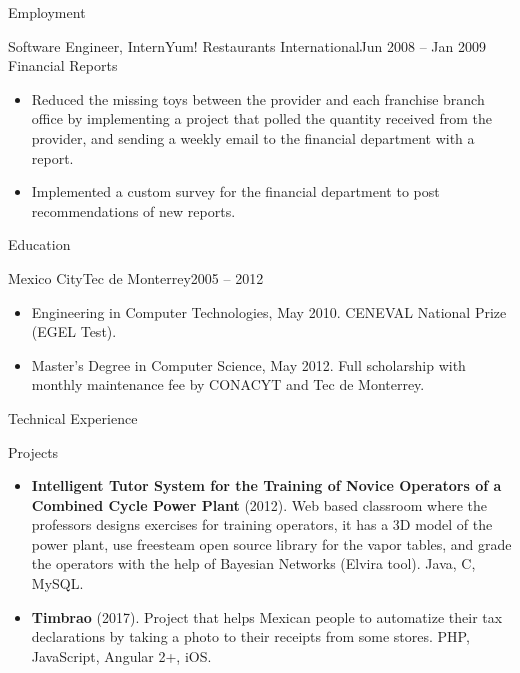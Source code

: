 \documentclass[calibri]{../macdowell-cv/mcdowellcv}
\begin{document}
\begin{cvsection}{Employment}
		\begin{cvsubsection}{Software Engineer, Intern}{Yum! Restaurants International}{Jun 2008 -- Jan 2009}
			Financial Reports			
			\begin{itemize}
				\item Reduced the missing toys between the provider and each franchise branch office by implementing a project that polled the quantity received from the provider, and sending a weekly email to the financial department with a report.
				\item Implemented a custom survey for the financial department to post recommendations of new reports.
			\end{itemize}
		\end{cvsubsection}
	\end{cvsection}
	
	\begin{cvsection}{Education}
		\begin{cvsubsection}{Mexico City}{Tec de Monterrey}{2005 -- 2012}
			\begin{itemize}
				\item Engineering in Computer Technologies, May 2010. CENEVAL National Prize (EGEL Test).
				\item Master's Degree in Computer Science, May 2012. Full scholarship with monthly maintenance fee by CONACYT and Tec de Monterrey.
			\end{itemize}
		\end{cvsubsection}
	\end{cvsection}
	
	\begin{cvsection}{Technical Experience}
		\begin{cvsubsection}{Projects}{}{}
			\begin{itemize}
				\item \textbf{Intelligent Tutor System for the Training of Novice Operators of a Combined Cycle Power Plant} (2012). Web based classroom where the professors designs exercises for training operators, it has a 3D model of the power plant, use freesteam open source library for the vapor tables, and grade the operators with the help of Bayesian Networks (Elvira tool). Java, C, MySQL.
				\item \textbf{Timbrao} (2017). Project that helps Mexican people to automatize their tax declarations by taking a photo to their receipts from some stores.  PHP, JavaScript, Angular 2+, iOS.
			\end{itemize}
		\end{cvsubsection}
	\end{cvsection}
	
\end{document}
